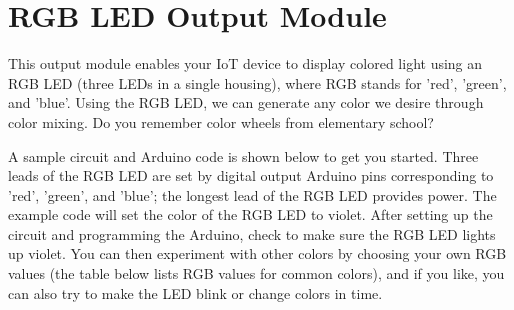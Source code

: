 
\clearpage
\section{RGB LED Output Module}
\label{sec-output-rgb}

This output module enables your IoT device to display colored light
using an RGB LED (three LEDs in a single housing), where RGB stands for 'red',
'green', and 'blue'. Using the RGB LED, we can generate any color we
desire through color mixing. Do you remember color wheels from
elementary school?

A sample circuit and Arduino code is shown below to get you started.
Three leads of the RGB LED are set by digital output Arduino pins
corresponding to 'red', 'green', and 'blue'; the longest lead of the RGB
LED provides power. The example code will set the color of the RGB LED
to violet. After setting up the circuit and programming the Arduino,
check to make sure the RGB LED lights up violet. You can then experiment
with other colors by choosing your own RGB values (the table below lists
RGB values for common colors), and if you like, you can also try to make
the LED blink or change colors in time.

